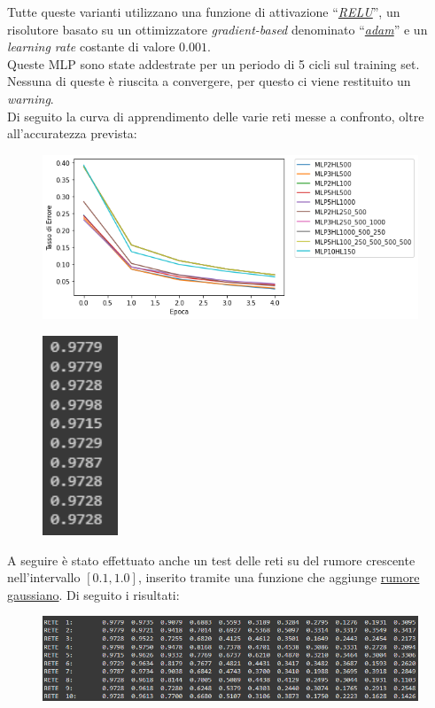 \documentclass[12pt, a4paper]{article}
\begin{document}
Tutte queste varianti utilizzano una funzione di attivazione “\href{https://it.wikipedia.org/wiki/Rettificatore_(reti_neurali)}{\textit{RELU}}”, un risolutore basato su un ottimizzatore \textit{gradient-based} denominato “\href{https://arxiv.org/abs/1412.6980}{\textit{adam}}” e un \textit{learning rate} costante di valore \(0.001\). \\
Queste MLP sono state addestrate per un periodo di 5 cicli sul training set. Nessuna di queste è riuscita a convergere, per questo ci viene restituito un \textit{warning}. \\
Di seguito la curva di apprendimento delle varie reti messe a confronto, oltre all'accuratezza prevista:
\begin{figure}[H]
    \centering 
    \includegraphics[width=\textwidth]{ConfrontoClassica.png}
\end{figure}
\begin{figure}[H]
    \centering
    \includegraphics[width=0.2\textwidth]{AccuratezzaClassica.png}
\end{figure}

A seguire è stato effettuato anche un test delle reti su del rumore crescente nell'intervallo \([0.1 , 1.0]\), inserito tramite una funzione che aggiunge \href{https://it.wikipedia.org/wiki/Rumore_gaussiano}{rumore gaussiano}. Di seguito i risultati:
\begin{figure}[H]
    \centering
    \includegraphics[width=\textwidth]{RisultatiRumoreClassica.png}
\end{figure}
\end{document}
